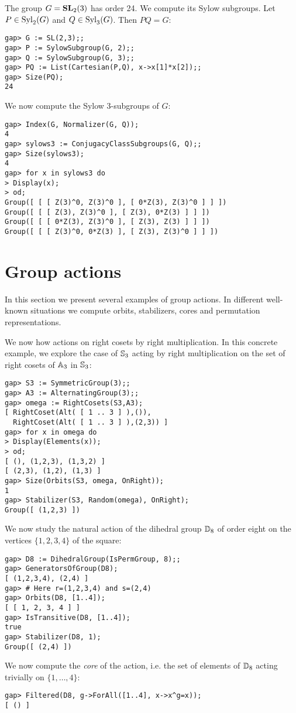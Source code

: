\begin{example}
\label{exa:Sylow}
The group $G=\mathbf{SL}_2(3)$ has order 24. We compute
its Sylow subgroups. Let $P\in\mathrm{Syl}_2(G)$ and
$Q\in\mathrm{Syl}_3(G)$. Then $PQ=G$: 
\begin{lstlisting}
gap> G := SL(2,3);;
gap> P := SylowSubgroup(G, 2);;
gap> Q := SylowSubgroup(G, 3);;
gap> PQ := List(Cartesian(P,Q), x->x[1]*x[2]);;
gap> Size(PQ);
24
\end{lstlisting}
We now compute the Sylow 3-subgroups of $G$:
\begin{lstlisting}
gap> Index(G, Normalizer(G, Q));
4
gap> sylows3 := ConjugacyClassSubgroups(G, Q);;
gap> Size(sylows3);
4
gap> for x in sylows3 do
> Display(x);
> od;
Group([ [ [ Z(3)^0, Z(3)^0 ], [ 0*Z(3), Z(3)^0 ] ] ])
Group([ [ [ Z(3), Z(3)^0 ], [ Z(3), 0*Z(3) ] ] ])
Group([ [ [ 0*Z(3), Z(3)^0 ], [ Z(3), Z(3) ] ] ])
Group([ [ [ Z(3)^0, 0*Z(3) ], [ Z(3), Z(3)^0 ] ] ])
\end{lstlisting}
\end{example}

\section{Group actions}

In this section we present several examples of group actions. In different
well-known situations we compute orbits, 
stabilizers, cores and permutation representations. 

\begin{example}
We now how actions on right cosets by right multiplication. In 
this concrete example, we explore 
the case of $\mathbb{S}_3$ 
acting by right multiplication
on the set of right cosets of $\mathbb{A}_3$ in $\mathbb{S}_3$:
\begin{lstlisting}
gap> S3 := SymmetricGroup(3);;
gap> A3 := AlternatingGroup(3);;
gap> omega := RightCosets(S3,A3);
[ RightCoset(Alt( [ 1 .. 3 ] ),()),
  RightCoset(Alt( [ 1 .. 3 ] ),(2,3)) ]
gap> for x in omega do
> Display(Elements(x));
> od;
[ (), (1,2,3), (1,3,2) ]
[ (2,3), (1,2), (1,3) ]  
gap> Size(Orbits(S3, omega, OnRight));
1
gap> Stabilizer(S3, Random(omega), OnRight);
Group([ (1,2,3) ])
\end{lstlisting}
\end{example}

\begin{example}
We now study the natural action 
of the dihedral group $\mathbb{D}_8$ of order eight 
on the vertices $\{1,2,3,4\}$ of the square:
\begin{lstlisting}
gap> D8 := DihedralGroup(IsPermGroup, 8);;
gap> GeneratorsOfGroup(D8);
[ (1,2,3,4), (2,4) ]
gap> # Here r=(1,2,3,4) and s=(2,4)
gap> Orbits(D8, [1..4]);
[ [ 1, 2, 3, 4 ] ]
gap> IsTransitive(D8, [1..4]);
true
gap> Stabilizer(D8, 1);
Group([ (2,4) ])
\end{lstlisting}
We now compute the \emph{core} of the action, i.e. 
the set of elements of $\mathbb{D}_8$ acting trivially on $\{1,\dots,4\}$: 
\begin{lstlisting}
gap> Filtered(D8, g->ForAll([1..4], x->x^g=x));
[ () ]
\end{lstlisting}
\end{example}

